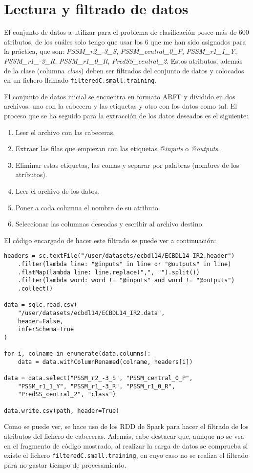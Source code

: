 \section{Lectura y filtrado de datos}

El conjunto de datos a utilizar para el problema de clasificación posee más de
600 atributos, de los cuáles solo tengo que usar los 6 que me han sido asignados
para la práctica, que son: \textit{PSSM\_r2\_-3\_S}, \textit{PSSM\_central\_0\_P},
\textit{PSSM\_r1\_1\_Y}, \textit{PSSM\_r1\_-3\_R}, \textit{PSSM\_r1\_0\_R},
\textit{PredSS\_central\_2}. Estos atributos, además de la clase (columna
\textit{class}) deben ser filtrados del conjunto de datos y colocados en un
fichero llamado \texttt{filteredC.small.training}.

El conjunto de datos inicial se encuentra en formato ARFF y dividido en dos
archivos: uno con la cabecera y las etiquetas y otro con los datos como tal. El
proceso que se ha seguido para la extracción de los datos deseados es el
siguiente:

\begin{enumerate}
    \item Leer el archivo con las cabeceras.
    \item Extraer las filas que empiezan con las etiquetas
          \textit{@inputs} o \textit{@outputs}.
    \item Eliminar estas etiquetas, las comas y separar por palabras (nombres de
          los atributos).
    \item Leer el archivo de los datos.
    \item Poner a cada columna el nombre de su atributo.
    \item Seleccionar las columnas deseadas y escribir al archivo destino.
\end{enumerate}

El código encargado de hacer este filtrado se puede ver a continuación:

\begin{lstlisting}
headers = sc.textFile("/user/datasets/ecbdl14/ECBDL14_IR2.header")
    .filter(lambda line: "@inputs" in line or "@outputs" in line)
    .flatMap(lambda line: line.replace(",", "").split())
    .filter(lambda word: word != "@inputs" and word != "@outputs")
    .collect()

data = sqlc.read.csv(
    "/user/datasets/ecbdl14/ECBDL14_IR2.data",
    header=False,
    inferSchema=True
)

for i, colname in enumerate(data.columns):
    data = data.withColumnRenamed(colname, headers[i])

data = data.select("PSSM_r2_-3_S", "PSSM_central_0_P",
    "PSSM_r1_1_Y", "PSSM_r1_-3_R", "PSSM_r1_0_R",
    "PredSS_central_2", "class")

data.write.csv(path, header=True)
\end{lstlisting}

Como se puede ver, se hace uso de los RDD de Spark para hacer el filtrado de los
atributos del fichero de cabeceras. Además, cabe destacar que, aunque no se vea
en el fragmento de código mostrado, al realizar la carga de datos se comprueba
si existe el fichero \texttt{filteredC.small.training}, en cuyo caso no se
realiza el filtrado para no gastar tiempo de procesamiento.
